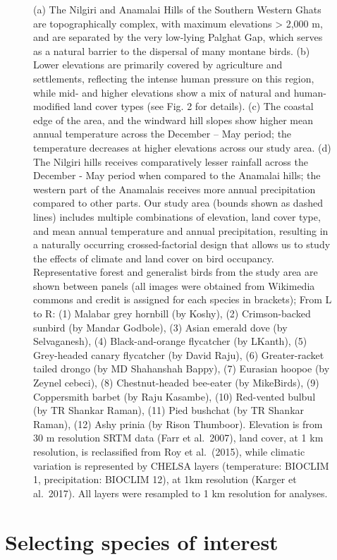 \documentclass[
]{article}
\begin{document}
\begin{figure}
{(a) The Nilgiri and Anamalai Hills of the Southern Western Ghats are topographically complex, with maximum elevations \textgreater{} 2,000 m, and are separated by the very low-lying Palghat Gap, which serves as a natural barrier to the dispersal of many montane birds. (b) Lower elevations are primarily covered by agriculture and settlements, reflecting the intense human pressure on this region, while mid- and higher elevations show a mix of natural and human-modified land cover types (see Fig. 2 for details). (c) The coastal edge of the area, and the windward hill slopes show higher mean annual temperature across the December -- May period; the temperature decreases at higher elevations across our study area. (d) The Nilgiri hills receives comparatively lesser rainfall across the December - May period when compared to the Anamalai hills; the western part of the Anamalais receives more annual precipitation compared to other parts. Our study area (bounds shown as dashed lines) includes multiple combinations of elevation, land cover type, and mean annual temperature and annual precipitation, resulting in a naturally occurring crossed-factorial design that allows us to study the effects of climate and land cover on bird occupancy. Representative forest and generalist birds from the study area are shown between panels (all images were obtained from Wikimedia commons and credit is assigned for each species in brackets); From L to R: (1) Malabar grey hornbill (by Koshy), (2) Crimson-backed sunbird (by Mandar Godbole), (3) Asian emerald dove (by Selvaganesh), (4) Black-and-orange flycatcher (by LKanth), (5) Grey-headed canary flycatcher (by David Raju), (6) Greater-racket tailed drongo (by MD Shahanshah Bappy), (7) Eurasian hoopoe (by Zeynel cebeci), (8) Chestnut-headed bee-eater (by MikeBirds), (9) Coppersmith barbet (by Raju Kasambe), (10) Red-vented bulbul (by TR Shankar Raman), (11) Pied bushchat (by TR Shankar Raman), (12) Ashy prinia (by Rison Thumboor). Elevation is from 30 m resolution SRTM data (Farr et al.~2007), land cover, at 1 km resolution, is reclassified from Roy et al.~(2015), while climatic variation is represented by CHELSA layers (temperature: BIOCLIM 1, precipitation: BIOCLIM 12), at 1km resolution (Karger et al.~2017). All layers were resampled to 1 km resolution for analyses.}
\end{figure}

\hypertarget{selecting-species-of-interest}{%
\section{Selecting species of interest}\label{selecting-species-of-interest}}
\end{document}
